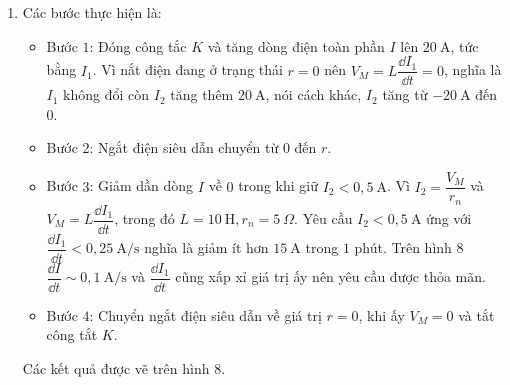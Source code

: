 \begin{loigiai}
\begin{enumerate}[1)]
\begin{center}

    \end{center}
    \item Các bước thực hiện là:
    \begin{itemize}
        \item Bước $1$: Đóng công tắc $K$ và tăng dòng điện toàn phần $I$ lên $20~\mathrm{A}$, tức bằng $I_1$. Vì nắt điện đang ở trạng thái $r = 0$ nên $V_M = L\dfrac{\dd I_1}{\dd t} = 0$, nghĩa là $I_1$ không đổi còn $I_2$ tăng thêm $20~\mathrm{A}$, nói cách khác, $I_2$ tăng từ $-20~\mathrm{A}$ đến $0$.
        \item Bước $2$:  Ngắt điện siêu dẫn chuyển từ $0$ đến $r$.
        \item Bước $3$: Giảm dần dòng $I$ về $0$ trong khi giữ $I_2 < 0,5 ~\mathrm{A}$. Vì $I_2 = \dfrac{V_M}{r_n}$ và $V_M = L\dfrac{\dd I_1}{\dd t}$, trong đó $L = 10~\mathrm{H}, r_n = 5~\Omega$. Yêu cầu $I_2 < 0,5~\mathrm{A}$ ứng với $\dfrac{\dd I_1}{\dd t} < 0,25 ~\mathrm{A/s}$ nghĩa là giảm ít hơn $15~\mathrm{A}$ trong $1$ phút. Trên hình $8$ $\dfrac{\dd I}{\dd t} \sim 0,1~\mathrm{A/s}$ và $\dfrac{\dd I_1}{\dd t}$ cũng xấp xỉ giá trị ấy nên yêu cầu được thỏa mãn.
        \item Bước $4$: Chuyển ngắt điện siêu dẫn về giá trị $r = 0$, khi ấy $V_M = 0$ và tắt công tắt $K$. 
    \end{itemize}
    Các kết quả được vẽ trên hình $8$.
    \begin{center}
        


\begin{tikzpicture}[x=0.75pt,y=0.75pt,yscale=-1,xscale=1]


\end{tikzpicture}
\end{center}
\end{enumerate}
\end{loigiai}
